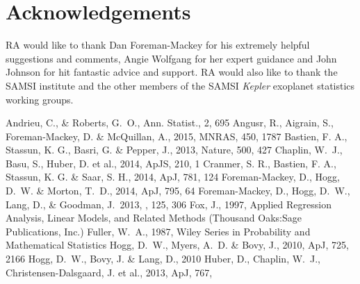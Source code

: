 \documentclass[apjl]{emulateapj}
\begin{document}
\acknowledgements
\section*{Acknowledgements}

RA would like to thank Dan Foreman-Mackey for his extremely helpful suggestions
and comments, Angie Wolfgang for her expert guidance and John Johnson for hit
fantastic advice and support.
RA would also like to thank the SAMSI institute and the other members of the
SAMSI {\it Kepler} exoplanet statistics working groups.


\begin{thebibliography}{99}
Andrieu, C., \& Roberts, G.~O., Ann. Statist., 2, 695
Angusr, R., Aigrain, S., Foreman-Mackey, D. \& McQuillan, A., 2015, MNRAS,
450, 1787
 Bastien,
F. A., Stassun, K. G., Basri, G. \& Pepper, J., 2013, Nature, 500, 427
Chaplin, W.~J., Basu, S., Huber, D. et al., 2014, ApJS, 210, 1
Cranmer, S. R., Bastien, F. A., Stassun, K. G. \& Saar, S. H., 2014, ApJ, 781,
124
 Foreman-Mackey, D., Hogg, D.~W. \& Morton, T.~D., 2014,
ApJ, 795, 64
Foreman-Mackey, D., Hogg, D.~W., Lang, D., \& Goodman, J.\ 2013, \pasp, 125, 306
Fox, J., 1997, Applied Regression Analysis, Linear Models, and Related Methods
(Thousand Oaks:Sage Publications, Inc.)
Fuller, W.~A., 1987, Wiley Series in Probability and Mathematical Statistics
Hogg, D.~W., Myers, A.~D. \& Bovy, J., 2010, ApJ, 725,
2166
Hogg, D.~W., Bovy, J. \& Lang, D., 2010
Huber, D., Chaplin, W.~J., Christensen-Dalsgaard, J. et al., 2013, ApJ, 767,

\end{thebibliography}
\end{document}
